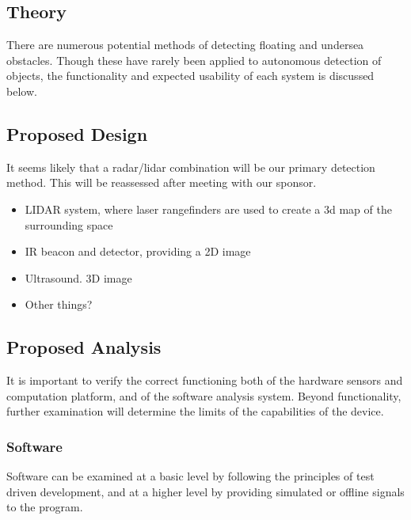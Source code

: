 \subsection{\label{sec:method:theory}Theory}
There are numerous potential methods of detecting floating and undersea obstacles. Though these have rarely been applied to autonomous detection of objects, the functionality and expected usability of each system is discussed below.

\subsubsection{\label{sec:theory:radar}}



\subsection{\label{sec:method:proposed-design}Proposed Design}
It seems likely that a radar/lidar combination will be our primary detection method.  This will be reassessed after meeting with our sponsor.


\begin{itemize}
\item LIDAR system, where laser rangefinders are used to create a 3d map of the surrounding space
\item IR beacon and detector, providing a 2D image
\item Ultrasound. 3D image
\item Other things?
\end{itemize}



\subsection{\label{sec:method:proposed-analysis}Proposed Analysis}
It is important to verify the correct functioning both of the hardware sensors and computation platform, and of the software analysis system. Beyond functionality, further examination will determine the limits of the capabilities of the device.
\subsubsection{\label{sec:method:proposed-analysis:software}Software}
Software can be examined at a basic level by following the principles of test driven development, and at a higher level by providing simulated or offline signals to the program.

